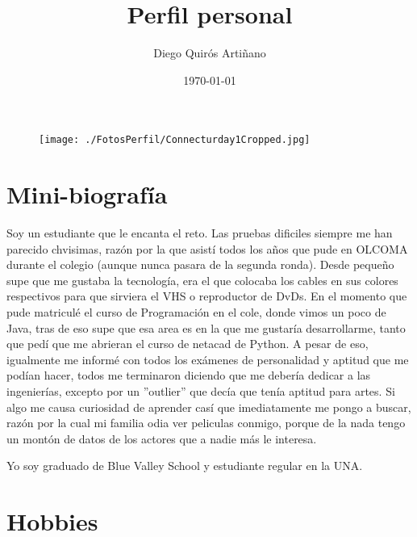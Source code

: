 \documentclass[12pt]{article} %
\title{Perfil personal}
\author{Diego Quirós Artiñano}\date{\today}
\newcommand{\authors}{}
\begin{document}
\hfill\authors %
\vspace{-0.25in} %
{\let\newpage\relax\maketitle} %
\vspace{-0.1in} %



\begin{figure}[htp]
\centering
\texttt{[image: ./FotosPerfil/Connecturday1Cropped.jpg]}

\caption{}
\label{foto}
\end{figure}

\section*{Mini-biografía}
Soy un estudiante que le encanta el reto. Las pruebas dificiles siempre me han parecido chvisimas, razón por la que asistí todos los años que pude en OLCOMA durante el colegio (aunque nunca pasara de la segunda ronda). Desde pequeño supe que me gustaba la tecnología, era el que colocaba los cables en sus colores respectivos para que sirviera el VHS o reproductor de DvDs. En el momento que pude matriculé el curso de Programación en el cole, donde vimos un poco de Java, tras de eso supe que esa area es en la que me gustaría desarrollarme, tanto que pedí que me abrieran el curso de netacad de Python. A pesar de eso, igualmente me informé con todos los exámenes de personalidad y aptitud que me podían hacer, todos me terminaron diciendo que me debería dedicar a las ingenierías, excepto por un ''outlier'' que decía que tenía aptitud para artes. Si algo me causa curiosidad de aprender casí que imediatamente me pongo a buscar, razón por la cual mi familia odia ver peliculas conmigo, porque de la nada tengo un montón de datos de los actores que a nadie más le interesa.

Yo soy graduado de Blue Valley School y estudiante regular en la UNA. 


\section*{Hobbies}
\end{document}
